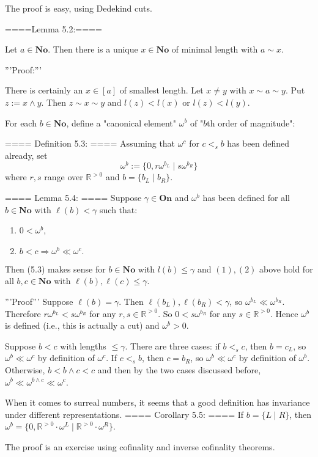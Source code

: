 The proof is easy, using Dedekind cuts.

====Lemma 5.2:====

Let $a\in \mathbf{No}$. Then there is a unique $x\in \mathbf{No}$ of minimal length with $a\sim x$.

'''Proof:'''

There is certainly an $x\in [a]$ of smallest length. Let $x\neq y$ with $x\sim a\sim y$. Put $z:=x\wedge y$. Then $z\sim x\sim y$ and $l(z)<l(x)$ or $l(z)<l(y)$.


For each $b\in\mathbf{No}$, define a "canonical element" $\omega^b$ of "$b$th order of magnitude":

==== Definition 5.3: ====
Assuming that $\omega^c$ for $c<_s b$ has been defined already, set 
$$\omega^b:=\{0,r\omega^{b_L}\mid s\omega^{b_R}\}$$
where $r,s$ range over $\mathbb{R}^{>0}$ and $b=\{b_L\mid b_R\}$.


==== Lemma 5.4: ====
Suppose $\gamma\in \mathbf{On}$ and $\omega^b$ has been defined for all $b\in \mathbf{No}$ with $\ell(b)<\gamma$ such that:
\begin{enumerate}
  \item  $0<\omega^b$,
  \item  $b<c \Rightarrow \omega^b\ll \omega^c.$
\end{enumerate}
Then (5.3) makes sense for $b\in \mathbf{No}$ with $l(b)\le \gamma$ and $(1),(2)$ above hold for all $b,c\in\mathbf{No}$ with $\ell(b),\ell(c)\le \gamma$. 

'''Proof'''
Suppose $\ell(b)=\gamma$. Then $\ell(b_L),\ell(b_R)<\gamma$, so $\omega^{b_L} \ll \omega^{b_R}$. Therefore $r\omega^{b_L}<s\omega^{b_R}$ for any $r,s\in \mathbb{R}^{>0}$. So $0<s\omega^{b_R}$ for any $s\in \mathbb{R}^{>0}$. Hence $\omega^b$ is defined (i.e., this is actually a cut) and $\omega^b>0$.

Suppose $b<c$ with lengths $\le \gamma$. There are three cases: if $b<_s c$, then $b=c_L$, so $\omega^b\ll\omega^c$ by definition of $\omega^c$. If $c<_s b$, then $c=b_R$, so $\omega^b\ll\omega^c$ by definition of $\omega^b$. Otherwise, $b<b\wedge c<c$ and then by the two cases discussed before,
$\omega^b\ll\omega^{b\wedge c}\ll\omega^c$.


When it comes to surreal numbers, it seems that a good definition has invariance under different representations.
==== Corollary 5.5: ====
If $b=\{L\mid R\}$, then $\omega^b=\{0,\mathbb{R}^{>0}\cdot \omega^L\mid \mathbb{R}^{>0}\cdot \omega^R\}$.

The proof is an exercise using cofinality and inverse cofinality theorems.

